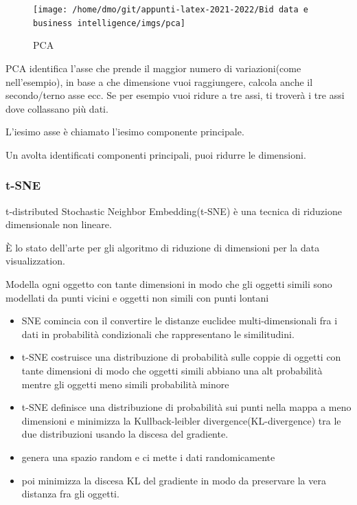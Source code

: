 \begin{figure}[H]
    \centering
    \texttt{[image: /home/dmo/git/appunti-latex-2021-2022/Bid data e business intelligence/imgs/pca]}
    \caption{PCA}
    \label{fig:PCA}
\end{figure}
PCA identifica l'asse che prende il maggior numero di variazioni(come nell'esempio),
in base a che dimensione vuoi raggiungere, calcola anche il secondo/terno asse ecc.
Se per esempio vuoi ridure a tre assi, ti troverà i tre assi dove collassano più dati.


L'iesimo asse è chiamato l'iesimo componente principale.

Un avolta identificati componenti principali, puoi ridurre le dimensioni.

\subsubsection{t-SNE}
t-distributed Stochastic Neighbor Embedding(t-SNE) è una tecnica di riduzione
dimensionale non lineare.

È lo stato dell'arte per gli algoritmo di riduzione di dimensioni per la data
visualizzation.


Modella ogni oggetto con tante dimensioni in modo che gli oggetti simili sono
modellati da punti vicini e oggetti non simili con punti lontani


\begin{itemize}
    \item SNE comincia con il convertire le distanze euclidee multi-dimensionali fra
    i dati in probabilità condizionali che rappresentano le similitudini.
    \item t-SNE costruisce una distribuzione di probabilità sulle coppie di oggetti con tante
    dimensioni di modo che oggetti simili abbiano una alt probabilità mentre gli oggetti
    meno simili probabilità minore
    \item t-SNE definisce una distribuzione di probabilità sui punti nella mappa a meno dimensioni
    e minimizza la Kullback-leibler divergence(KL-divergence) tra le due distribuzioni usando
    la discesa del gradiente.
    \item genera una spazio random e ci mette i dati randomicamente
    \item poi minimizza la discesa KL del gradiente in modo da preservare la vera distanza
    fra gli oggetti.
\end{itemize}



